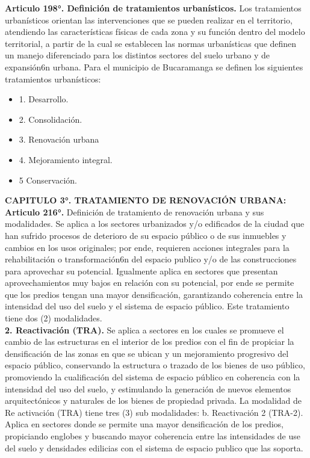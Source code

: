 \documentclass[12pt,a4paper,twoside]{article}
\begin{document}
{\textbf{Articulo 198°. Definición de tratamientos urbanísticos.} Los tratamientos urbanísticos orientan las
intervenciones que se pueden realizar en el territorio, atendiendo las características físicas de cada
zona y su función dentro del modelo territorial, a partir de la cual se establecen las normas urbanísticas
que definen un manejo diferenciado para los distintos sectores del suelo urbano y de expansión6n urbana.
Para el municipio de Bucaramanga se definen los siguientes tratamientos urbanísticos:
\begin{itemize}
	\item 1. Desarrollo.
	\item 2. Consolidación.
	\item 3. Renovación urbana
	\item 4. Mejoramiento integral.
	\item 5 Conservación.
\end{itemize}

\textbf{CAPITULO 3°. TRATAMIENTO DE RENOVACIÓN URBANA:} \\

\textbf{Articulo 216°.} Definición de tratamiento de renovación urbana y sus modalidades. Se aplica a
los sectores urbanizados y/o edificados de la ciudad que han sufrido procesos de deterioro de su
espacio público o de sus inmuebles y cambios en los usos originales; por ende, requieren acciones
integrales para la rehabilitación o transformación6n del espacio publico y/o de las construcciones para
aprovechar su potencial. Igualmente aplica en sectores que presentan aprovechamientos muy bajos
en relación con su potencial, por ende se permite que los predios tengan una mayor densificación,
garantizando coherencia entre la intensidad del uso del suelo y el sistema de espacio público. Este
tratamiento tiene dos (2) modalidades.\\

\textbf{2. Reactivación (TRA).} Se aplica a sectores en los cuales se promueve el cambio de las estructuras
en el interior de los predios con el fin de propiciar la densificación de las zonas en que se ubican y un
mejoramiento progresivo del espacio público, conservando la estructura o trazado de los bienes de
uso público, promoviendo la cualificación del sistema de espacio público en coherencia con la
intensidad del uso del suelo, y estimulando la generación de nuevos elementos arquitectónicos y
naturales de los bienes de propiedad privada.
La modalidad de Re activación (TRA) tiene tres (3) sub modalidades:
b. Reactivación 2 (TRA-2). Aplica en sectores donde se permite una mayor densificación de los predios, propiciando englobes y buscando mayor coherencia entre las intensidades de use del suelo y densidades edilicias con el sistema de espacio publico que las soporta.


}
\end{document}
